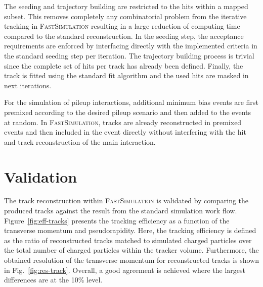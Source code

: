 \documentclass[a4paper]{jpconf}
\begin{document}
The seeding and trajectory building are restricted to the hits within a mapped subset. This removes completely any combinatorial problem from the iterative tracking in \textsc{FastSimulation} resulting in a large reduction of computing time compared to the standard reconstruction. In the seeding step, the acceptance requirements are enforced by interfacing directly with the implemented criteria in the standard seeding step per iteration. The trajectory building process is trivial since the complete set of hits per track has already been defined. Finally, the track is fitted using the standard fit algorithm and the used hits are masked in next iterations.

For the simulation of pileup interactions, additional minimum bias events are first premixed according to the desired pileup scenario and then added to the events at random. In \textsc{FastSimulation}, tracks are already reconstructed in premixed events and then included in the event directly without interfering with the hit and track reconstruction of the main interaction.


\section{Validation}

The track reconstruction within \textsc{FastSimulation} is validated by comparing the produced tracks against the result from the standard simulation work flow. Figure~\ref{fig:eff-tracks} presents the tracking efficiency as a function of the transverse momentum and pseudorapidity. Here, the tracking efficiency is defined as the ratio of reconstructed tracks matched to simulated charged particles over the total number of charged particles within the tracker volume. Furthermore, the obtained resolution of the transverse momentum for reconstructed tracks is shown in Fig.~\ref{fig:res-track}. Overall, a good agreement is achieved where the largest differences are at the 10\% level.
\end{document}
